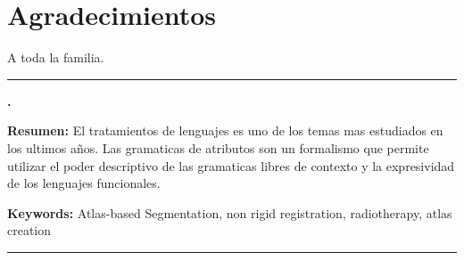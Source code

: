 \documentclass[a4paper,11pt,twoside]{ThesisStyle}
\begin{document}


\dominitoc


\cleardoublepage

\section*{Agradecimientos}

 A toda la familia.

\tableofcontents

\mainmatter

% 
\appendix



% 
% 


\cleardoublepage
\begin{vcenterpage}
\noindent\rule[2pt]{\textwidth}{0.5pt}
\begin{center}
{\large\textbf{\maggen.\\}}
\end{center}
{\large\textbf{Resumen:}}
El tratamientos de lenguajes es uno de los temas mas estudiados en los ultimos años.
Las gramaticas de atributos son un formalismo que permite utilizar el poder descriptivo de las gramaticas libres de contexto y la expresividad de los lenguajes funcionales. 

{\large\textbf{Keywords:}}
Atlas-based Segmentation, non rigid registration, radiotherapy, atlas creation
\\
\noindent\rule[2pt]{\textwidth}{0.5pt}
\end{vcenterpage}
\end{document}
